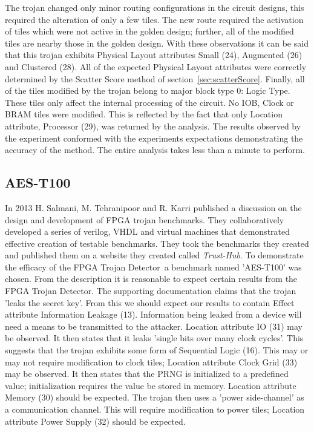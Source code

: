 \documentclass[conference]{IEEEtran}
\newcommand{\Name}{\acrshort{FPGA} Trojan Detector}
\newcommand{\NameNoPeriod}{\Name~}
\begin{document}
The trojan changed only minor routing configurations in the circuit designs, this required the alteration of only a few tiles.
The new route required the activation of tiles which were not active in the \gls{golden} design; further, all of the modified tiles are nearby those in the \gls{golden} design. 
With these observations it can be said that this trojan exhibits Physical Layout attributes Small (24), Augmented (26) and Clustered (28). 
All of the expected Physical Layout attributes were correctly determined by the Scatter Score method of section~\ref{sec:scatterScore}.
Finally, all of the tiles modified by the trojan belong to major block type 0: Logic Type.
These tiles only affect the internal processing of the circuit.
No \acrshort{IOB}, Clock or \acrshort{BRAM} tiles were modified.
This is reflected by the fact that only Location attribute, Processor (29), was returned by the analysis.
The results observed by the experiment conformed with the experiments expectations demonstrating the accuracy of the method.
The entire analysis takes less than a minute to perform.

\subsection{AES-T100} \label{sec:aesT100}
In 2013 H. Salmani, M. Tehranipoor and R. Karri published a discussion on the design and development of \acrshort{FPGA} trojan benchmarks.
They collaboratively developed a series of verilog, VHDL and virtual machines that demonstrated effective creation of testable benchmarks.
They took the benchmarks they created and published them on a website they created called \textit{Trust-Hub}.
To demonstrate the efficacy of the \NameNoPeriod a benchmark named 'AES-T100' was chosen. 
From the description it is reasonable to expect certain results from the \Name.
The supporting documentation claims that the trojan 'leaks the secret key'.
From this we should expect our results to contain Effect attribute Information Leakage (13).
Information being leaked from a device will need a means to be transmitted to the attacker.
Location attribute \acrshort{IO} (31) may be observed.
It then states that it leaks 'single bits over many clock cycles'. 
This suggests that the trojan exhibits some form of Sequential Logic (16).
This may or may not require modification to clock tiles; Location attribute Clock Grid (33) may be observed. 
It then states that the PRNG is initialized to a predefined value; initialization requires the value be stored in memory. 
Location attribute Memory (30) should be expected.
The trojan then uses a 'power side-channel' as a communication channel.
This will require modification to power tiles; Location attribute Power Supply (32) should be expected.
\end{document}
